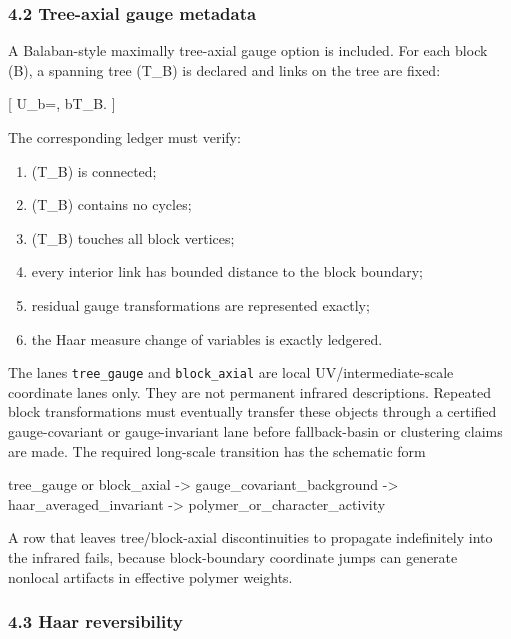 \documentclass[
]{article}
\newenvironment{Shaded}{}{}
\newcommand{\NormalTok}[1]{#1}
\providecommand{\tightlist}{%
  \setlength{\itemsep}{0pt}\setlength{\parskip}{0pt}}
\begin{document}
\subsubsection{4.2 Tree-axial gauge
metadata}\label{tree-axial-gauge-metadata}

A Balaban-style maximally tree-axial gauge option is included. For each
block (B), a spanning tree (T\_B) is declared and links on the tree are
fixed:

{[} U\_b=, \qquad b\in T\_B. {]}

The corresponding ledger must verify:

\begin{enumerate}
\def\labelenumi{\arabic{enumi}.}
\tightlist
\item
  (T\_B) is connected;
\item
  (T\_B) contains no cycles;
\item
  (T\_B) touches all block vertices;
\item
  every interior link has bounded distance to the block boundary;
\item
  residual gauge transformations are represented exactly;
\item
  the Haar measure change of variables is exactly ledgered.
\end{enumerate}

The lanes \texttt{tree\_gauge} and \texttt{block\_axial} are local
UV/intermediate-scale coordinate lanes only. They are not permanent
infrared descriptions. Repeated block transformations must eventually
transfer these objects through a certified gauge-covariant or
gauge-invariant lane before fallback-basin or clustering claims are
made. The required long-scale transition has the schematic form

\begin{Shaded}
\begin{Highlighting}[]
\NormalTok{tree\_gauge or block\_axial}
\NormalTok{  {-}\textgreater{} gauge\_covariant\_background}
\NormalTok{  {-}\textgreater{} haar\_averaged\_invariant}
\NormalTok{  {-}\textgreater{} polymer\_or\_character\_activity}
\end{Highlighting}
\end{Shaded}

A row that leaves tree/block-axial discontinuities to propagate
indefinitely into the infrared fails, because block-boundary coordinate
jumps can generate nonlocal artifacts in effective polymer weights.

\subsubsection{4.3 Haar reversibility}\label{haar-reversibility}
\end{document}
